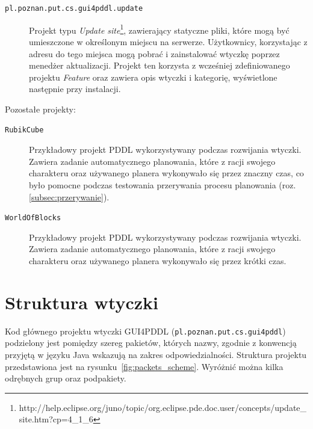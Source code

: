 \begin{description}
\item [\texttt{pl.poznan.put.cs.gui4pddl.update}] Projekt typu \emph{Update site}\footnote{http://help.eclipse.org/juno/topic/org.eclipse.pde.doc.user/concepts/update\_site.htm?cp=4\_1\_6}, zawierający statyczne pliki, które mogą być umieszczone w określonym miejscu na serwerze. Użytkownicy, korzystając z adresu do tego miejsca mogą pobrać i zainstalować wtyczkę poprzez menedżer aktualizacji. Projekt ten korzysta z wcześniej zdefiniowanego projektu \emph{Feature} oraz zawiera opis wtyczki i kategorię, wyświetlone następnie przy instalacji.
\end{description}

Pozostałe projekty:
\begin{description}
\item [\texttt{RubikCube}] Przykładowy projekt PDDL wykorzystywany podczas rozwijania wtyczki. Zawiera zadanie automatycznego planowania, które z racji swojego charakteru oraz używanego planera wykonywało się przez znaczny czas, co było pomocne podczas testowania przerywania procesu planowania (roz. \ref{subsec:przerywanie}).
\item [\texttt{WorldOfBlocks}] Przykładowy projekt PDDL wykorzystywany podczas rozwijania wtyczki. Zawiera zadanie automatycznego planowania, które z racji swojego charakteru oraz używanego planera wykonywało się przez krótki czas.
\end{description}

\section{Struktura wtyczki}
\label{sec:struktura}

Kod głównego projektu wtyczki GUI4PDDL (\texttt{pl.poznan.put.cs.gui4pddl}) podzielony jest pomiędzy szereg pakietów, których nazwy, zgodnie z konwencją przyjętą w języku Java wskazują na zakres odpowiedzialności. Struktura projektu przedstawiona jest na rysunku~\ref{fig:packets_scheme}. Wyróżnić można kilka odrębnych grup oraz podpakiety.

